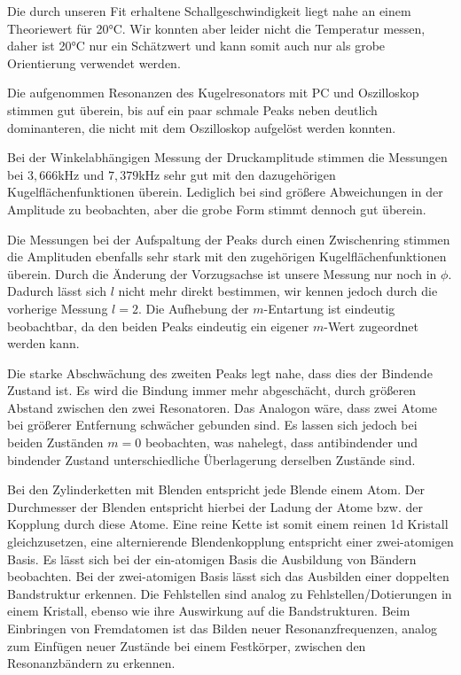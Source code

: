 Die durch unseren Fit erhaltene Schallgeschwindigkeit liegt nahe an einem Theoriewert für 20°C.
Wir konnten aber leider nicht die Temperatur messen, daher ist 20°C nur ein Schätzwert und kann somit auch nur als grobe Orientierung verwendet werden.

Die aufgenommen Resonanzen des Kugelresonators mit PC und Oszilloskop stimmen gut überein, bis auf ein paar schmale Peaks neben deutlich dominanteren, die nicht mit dem Oszilloskop aufgelöst werden konnten.

Bei der Winkelabhängigen Messung der Druckamplitude stimmen die Messungen bei $3,666$kHz und $7,379$kHz sehr gut mit den dazugehörigen Kugelflächenfunktionen überein.
Lediglich bei sind größere Abweichungen in der Amplitude zu beobachten, aber die grobe Form stimmt dennoch gut überein.

Die Messungen bei der Aufspaltung der Peaks durch einen Zwischenring stimmen die Amplituden ebenfalls sehr stark mit den zugehörigen Kugelflächenfunktionen überein.
Durch die Änderung der Vorzugsachse ist unsere Messung nur noch in $\phi$.
Dadurch lässt sich $l$ nicht mehr direkt bestimmen, wir kennen jedoch durch die vorherige Messung $l=2$.
Die Aufhebung der $m$-Entartung  ist eindeutig beobachtbar, da den beiden Peaks eindeutig ein eigener $m$-Wert zugeordnet werden kann.

Die starke Abschwächung des zweiten Peaks legt nahe, dass dies der Bindende Zustand ist.
Es wird die Bindung immer mehr abgeschächt, durch größeren Abstand zwischen den zwei Resonatoren.
Das Analogon wäre, dass zwei Atome bei größerer Entfernung schwächer gebunden sind.
Es lassen sich jedoch bei beiden Zuständen $m=0$ beobachten, was nahelegt, dass antibindender und bindender Zustand unterschiedliche Überlagerung derselben Zustände sind.

Bei den Zylinderketten mit Blenden entspricht jede Blende einem Atom.
Der Durchmesser der Blenden entspricht hierbei der Ladung der Atome bzw. der Kopplung durch diese Atome.
Eine reine Kette ist somit einem reinen 1d Kristall gleichzusetzen, eine alternierende Blendenkopplung entspricht einer zwei-atomigen Basis.
Es lässt sich bei der ein-atomigen Basis die Ausbildung von Bändern beobachten.
Bei der zwei-atomigen Basis lässt sich das Ausbilden einer doppelten Bandstruktur erkennen.
Die Fehlstellen sind analog zu Fehlstellen/Dotierungen in einem Kristall, ebenso wie ihre Auswirkung auf die Bandstrukturen.
Beim Einbringen von Fremdatomen ist das Bilden neuer Resonanzfrequenzen, analog zum Einfügen neuer Zustände bei einem Festkörper, zwischen den Resonanzbändern zu erkennen.